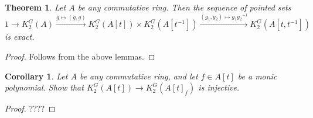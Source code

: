 \documentclass[oneside,12pt]{amsart}
\newtheorem{thm}{Theorem}
\numberwithin{equation}{section}
\numberwithin{lem}{section}
\newtheorem{cor}[lem]{Corollary}
\theoremstyle{definition}
\theoremstyle{remark}
\newcommand{\st}{\scriptstyle}
\begin{document}
\begin{thm}
Let $A$ be any commutative ring. Then the sequence of pointed sets
$$1\longrightarrow K_2^G(A)\xrightarrow{\st g\mapsto (g,g)} K_2^G(A[t])\times K_2^G(A[t^{-1}])
\xrightarrow{\st (g_1,g_2)\mapsto g_1{g_2}^{-1}} K_2^G(A[t,t^{-1}])$$
is exact.
\end{thm}
\begin{proof}
Follows from the above lemmas.
\end{proof}

\begin{cor}
 Let $A$ be any commutative ring, and let $f\in A[t]$ be a monic polynomial. Show that
$K_2^G(A[t])\to K_2^G(A[t]_f)$ is injective.
\end{cor}
\begin{proof}
????
\end{proof}
\end{document}
